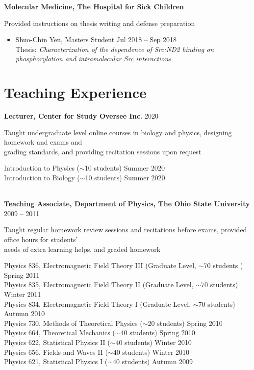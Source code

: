 \documentclass[11pt]{../yhlcv}
\begin{document}
{\bf Molecular Medicine, The Hospital for Sick Children} \vspace{0.25em}

Provided instructions on thesis writing and defense preparation
\vspace{-0.5em}\\
\begin{itemize}[leftmargin=*]\itemsep-0.2em
\item Shuo-Chin Yen, 
Masters Student 
\hfill Jul 2018 -- Sep 2018 \\
Thesis: {\it Characterization of the dependence of Src:ND2 binding on 
	phosphorylation and intramolecular Src interactions} 
\end{itemize}


\section*{Teaching Experience}

{\bf Lecturer, Center for Study Oversee Inc. } \hfill 2020\vspace{0.5em}

Taught undergraduate level online courses in biology and physics, designing homework and exams
and \\ grading standards, and providing recitation sessions upon request  \vspace{0.5em}

Introduction to Physics ($\sim$10 students) \hfill Summer 2020 \\
Introduction to Biology ($\sim$10 students) \hfill Summer 2020 \\

\ \

{\bf Teaching Associate, Department of Physics, The Ohio State University} \hfill 2009 -- 2011\vspace{0.5em}

Taught regular homework review sessions and recitations before exams, provided office hours
for students' \\ needs of extra learning helps, and graded homework \vspace{0.5em}

Physics 836, Electromagnetic Field Theory III (Graduate Level, $\sim$70 students ) \hfill Spring 2011\\
Physics 835, Electromagnetic Field Theory II (Graduate Level, $\sim$70 students) \hfill  Winter 2011 \\
Physics 834, Electromagnetic Field Theory I (Graduate Level, $\sim$70 students) \hfill Autumn 2010 \\
Physics 730, Methods of Theoretical Physics ($\sim$20 students) \hfill Spring 2010 \\
Physics 664, Theoretical Mechanics ($\sim$40 students) \hfill Spring 2010 \\
Physics 622, Statistical Physics II ($\sim$40 students) \hfill Winter 2010 \\
Physics 656, Fields and Waves II ($\sim$40 students) \hfill Winter 2010 \\
Physics 621, Statistical Physics I ($\sim$40 students) \hfill Autumn 2009
\end{document}
